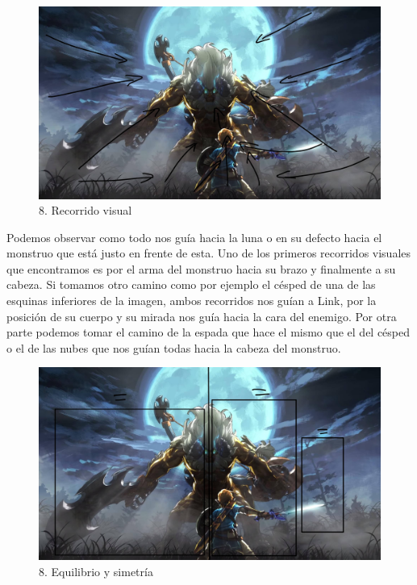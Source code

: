 \documentclass[12pt]{article}
\begin{document}
\begin{figure}[H]
      \centering
      \includegraphics[width=\textwidth]{images/Raúl/Sección 8/Imagen 8 recorridos.jpg}
      \caption{\small 8. Recorrido visual}
    \end{figure}

Podemos observar como todo nos guía hacia la luna o en su defecto hacia el monstruo que está justo en frente de esta. Uno de los primeros recorridos visuales que encontramos es por el arma del monstruo hacia su brazo y finalmente a su cabeza. Si tomamos otro camino como por ejemplo el césped de una de las esquinas inferiores de la imagen, ambos recorridos nos guían a Link, por la posición de su cuerpo y su mirada nos guía hacia la cara del enemigo. Por otra parte podemos tomar el camino de la espada que hace el mismo que el del césped o el de las nubes que nos guían todas hacia la cabeza del monstruo.

\begin{figure}[H]
      \centering
      \includegraphics[width=\textwidth]{images/Raúl/Sección 8/Imagen 8 regla pesos.jpg}
      \caption{\small 8. Equilibrio y simetría}
    \end{figure}
\end{document}

